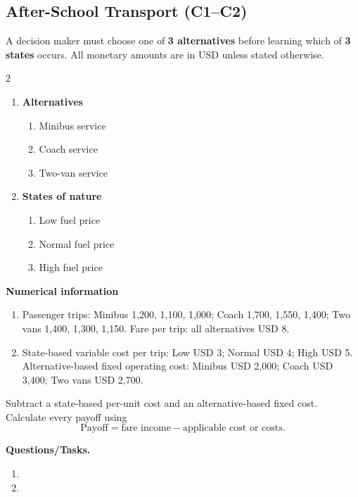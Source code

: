 \subsection{After-School Transport (C1--C2)}
\label{sec:problem18-after-school-transport-c1-c2}
A decision maker must choose one of \textbf{3 alternatives} before learning which of \textbf{3 states} occurs. All monetary amounts are in USD unless stated otherwise.
\begin{multicols}{2}
\begin{enumerate}[label=\arabic*.]
 \item \textbf{Alternatives}
 \begin{enumerate}[label=\roman*)]
  \item Minibus service
  \item Coach service
  \item Two-van service
 \end{enumerate}
 \item \textbf{States of nature}
 \begin{enumerate}[label=\roman*)]
  \item Low fuel price
  \item Normal fuel price
  \item High fuel price
 \end{enumerate}
\end{enumerate}
\end{multicols}
 \textbf{Numerical information}
 \begin{enumerate}[label=\roman*)]
  \item Passenger trips: Minibus 1,200, 1,100, 1,000; Coach 1,700, 1,550, 1,400; Two vans 1,400, 1,300, 1,150. Fare per trip: all alternatives USD 8.
  \item State-based variable cost per trip: Low USD 3; Normal USD 4; High USD 5. Alternative-based fixed operating cost: Minibus USD 2,000; Coach USD 3,400; Two vans USD 2,700.
 \end{enumerate}
Subtract a state-based per-unit cost and an alternative-based fixed cost. Calculate every payoff using
\[
 \text{Payoff}=\text{fare income}-\text{applicable cost or costs}.
\]

\textbf{Questions/Tasks.}
\begin{enumerate}[label=\textbf{\alph*)}]
 \item {}
 \item {}
\end{enumerate}
